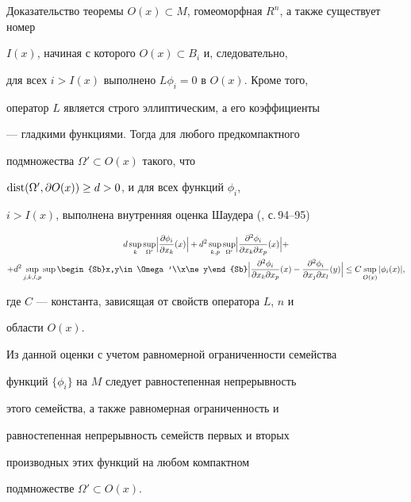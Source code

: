 \begin{pf*}{Доказательство теоремы}
$O(x)\subset M$, гомеоморфная $R^n$, а также существует номер


$I(x)$, начиная с которого $O(x)\subset B_i$ и, следовательно,


для всех $i>I(x)$ выполнено $L\phi_i=0$ в $O(x)$. Кроме того,


оператор $L$ является строго эллиптическим, а его коэффициенты


--- гладкими функциями. Тогда для любого предкомпактного


подмножества $\Omega'\subset O(x)$ такого, что


$\operatorname{dist}(\Omega',\partial O(x))\ge d>0$, и для всех функций $\phi_i$,


$i>I(x)$, выполнена внутренняя оценка Шаудера (\cite{Gil}, с.\,94--95)


\begin{multline*}


d\sup_{k}\sup_{\Omega'}\Bigl|\frac{\dl{\phi_i}}{\dl{x_k}}(x)\Bigr|+


d^2\sup_{k,p}\sup_{\Omega'}


\Bigl|\frac{\partial^2\phi_i}{\dl{x_k}\dl{x_p}}(x)\Bigr|+\\


%


+d^2\sup_{j,k,l,p}\sup\begin{Sb}x,y\in\Omega'\\x\ne y\end{Sb}


\Bigl|\frac{\partial^2\phi_i}{\dl{x_k}\dl{x_p}}(x)-


\frac{\partial^2\phi_i}{\dl{x_j}\dl{x_l}}(y)\Bigr|\le


C\sup_{O(x)}|\phi_i(x)|,


\end{multline*}


где $C$ --- константа, зависящая от свойств оператора $L$, $n$ и


области $O(x)$.


Из данной оценки с учетом равномерной ограниченности семейства


функций $\{\phi_i\}$ на $M$ следует равностепенная непрерывность


этого семейства, а также равномерная ограниченность и


равностепенная непрерывность семейств первых и вторых


производных этих функций на любом компактном


подмножестве  $\Omega'\subset O(x)$.



\end{pf*}
